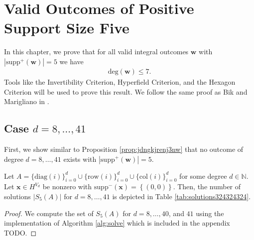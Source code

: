 \chapter{Valid Outcomes of Positive Support
Size Five}

In this chapter, we prove that for all valid integral outcomes \( \mathbf w \) with \( |\mathrm{supp}^+(\mathbf w)| = 5 \) we have
\begin{align*}
    \mathrm{deg}(\mathbf w) \leq 7.
\end{align*}
Tools like the Invertibility Criterion, Hyperfield Criterion, and the Hexagon Criterion will be used to prove this result. We follow the same proof as Bik and Marigliano in \cite{bik2022classifying}.

\section{Case \( d = 8, \dots, 41 \)}

First, we show similar to Proposition \ref{prop:jdngkjrenj3nw} that no outcome of degree \( d = 8, \dots, 41 \) exists with \( |\mathrm{supp}^+(\mathbf w)| = 5 \).

\begin{proposition}
    Let $A = \{ \mathrm{diag}(i) \}_{i=0}^d \cup \{ \mathrm{row}(i)\}^d_{i=0} \cup \{ \mathrm{col}(i) \}^d_{i=0}$ for some degree \( d \in \mathbb{N} \). Let \( \mathbf{x} \in H^{V_d} \) be nonzero with \( \mathrm{supp}^-(\mathbf{x}) = \left\{ (0,0) \right\} \). Then, the number of solutions \( \lvert S_5(A) \rvert \) for \( d = 8, \dots, 41 \) is depicted in Table \ref{tab:solutions324324324}.
\end{proposition}

\begin{proof}
    We compute the set of \( S_5(A) \) for \( d = 8, \dots, 40 \), and \( 41 \) using the implementation of Algorithm \ref{alg:solve} which is included in the appendix TODO.
\end{proof}

